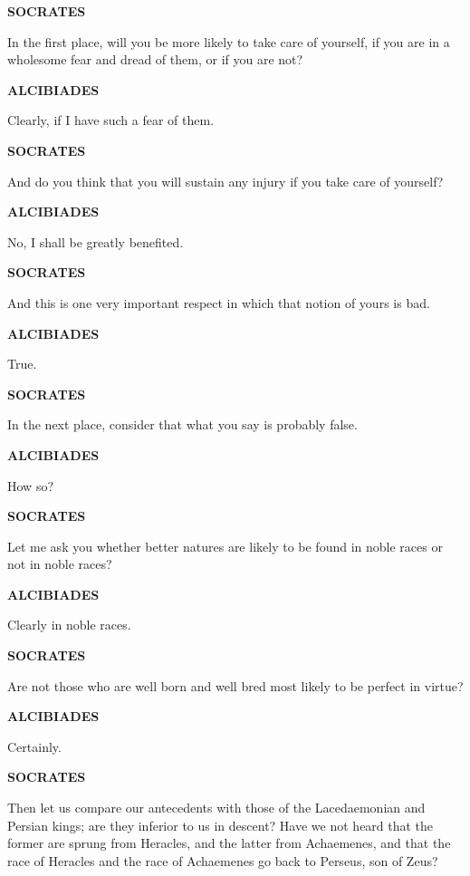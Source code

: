\documentclass[11pt,letter]{article}
\begin{document}
\par \textbf{SOCRATES}
\par   In the first place, will you be more likely to take care of yourself, if you are in a wholesome fear and dread of them, or if you are not?

\par \textbf{ALCIBIADES}
\par   Clearly, if I have such a fear of them.

\par \textbf{SOCRATES}
\par   And do you think that you will sustain any injury if you take care of yourself?

\par \textbf{ALCIBIADES}
\par   No, I shall be greatly benefited.

\par \textbf{SOCRATES}
\par   And this is one very important respect in which that notion of yours is bad.

\par \textbf{ALCIBIADES}
\par   True.

\par \textbf{SOCRATES}
\par   In the next place, consider that what you say is probably false.

\par \textbf{ALCIBIADES}
\par   How so?

\par \textbf{SOCRATES}
\par   Let me ask you whether better natures are likely to be found in noble races or not in noble races?

\par \textbf{ALCIBIADES}
\par   Clearly in noble races.

\par \textbf{SOCRATES}
\par   Are not those who are well born and well bred most likely to be perfect in virtue?

\par \textbf{ALCIBIADES}
\par   Certainly.

\par \textbf{SOCRATES}
\par   Then let us compare our antecedents with those of the Lacedaemonian and Persian kings; are they inferior to us in descent? Have we not heard that the former are sprung from Heracles, and the latter from Achaemenes, and that the race of Heracles and the race of Achaemenes go back to Perseus, son of Zeus?
\end{document}
